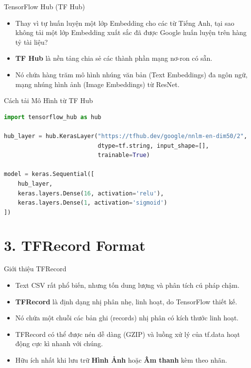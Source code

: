 \documentclass[aspectratio=169]{beamer}
\begin{document}
\begin{frame}{TensorFlow Hub (TF Hub)}
    \begin{itemize}
        \item Thay vì tự huấn luyện một lớp Embedding cho các từ Tiếng Anh, tại sao không tải một lớp Embedding xuất sắc đã được Google huấn luyện trên hàng tỷ tài liệu?
        \item \textbf{TF Hub} là nền tảng chia sẻ các thành phần mạng nơ-ron có sẵn.
        \item Nó chứa hàng trăm mô hình nhúng văn bản (Text Embeddings) đa ngôn ngữ, mạng nhúng hình ảnh (Image Embeddings) từ ResNet.
    \end{itemize}
\end{frame}

\begin{frame}[fragile]{Cách tải Mô Hình từ TF Hub}
\begin{lstlisting}[language=Python]
import tensorflow_hub as hub

hub_layer = hub.KerasLayer("https://tfhub.dev/google/nnlm-en-dim50/2",
                           dtype=tf.string, input_shape=[], 
                           trainable=True)

model = keras.Sequential([
    hub_layer,
    keras.layers.Dense(16, activation='relu'),
    keras.layers.Dense(1, activation='sigmoid')
])
\end{lstlisting}
\end{frame}

\section{3. TFRecord Format}

\begin{frame}{Giới thiệu TFRecord}
    \begin{itemize}
        \item Text CSV rất phổ biến, nhưng tốn dung lượng và phân tích cú pháp chậm.
        \item \textbf{TFRecord} là định dạng nhị phân nhẹ, linh hoạt, do TensorFlow thiết kế.
        \item Nó chứa một chuỗi các bản ghi (records) nhị phân có kích thước linh hoạt.
        \item TFRecord có thể được nén dễ dàng (GZIP) và luồng xử lý của tf.data hoạt động cực kì nhanh với chúng.
        \item Hữu ích nhất khi lưu trữ \textbf{Hình Ảnh} hoặc \textbf{Âm thanh} kèm theo nhãn.
    \end{itemize}
\end{frame}
\end{document}
